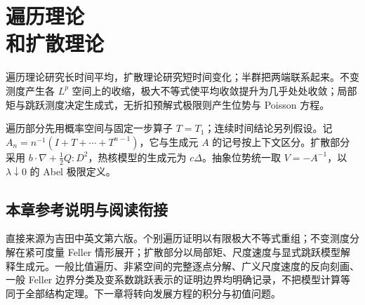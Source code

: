 \chapter[遍历理论和扩散理论]{遍历理论\\和扩散理论}\label{ch:yosida-13}

遍历理论研究长时间平均，扩散理论研究短时间变化；半群把两端联系起来。不变测度产生各 $L^p$ 空间上的收缩，极大不等式使平均收敛提升为几乎处处收敛；局部矩与跳跃测度决定生成式，无折扣预解式极限则产生位势与 Poisson 方程。

遍历部分先用概率空间与固定一步算子 $T=T_1$；连续时间结论另列假设。记 $A_n=n^{-1}(I+T+\cdots+T^{n-1})$，它与生成元 $A$ 的记号按上下文区分。扩散部分采用 $b\cdot\nabla+\tfrac12Q:D^2$，热核模型的生成元为 $c\Delta$。抽象位势统一取 $V=-A^{-1}$，以 $\lambda\downarrow0$ 的 Abel 极限定义。











\section*{本章参考说明与阅读衔接}
直接来源为吉田中英文第六版。个别遍历证明以有限极大不等式重组；不变测度分解在紧可度量 Feller 情形展开；扩散部分以局部矩、尺度速度与显式跳跃模型解释生成元。一般比值遍历、非紧空间的完整逐点分解、广义尺度速度的反向刻画、一般 Feller 边界分类及变系数跳跃表示的证明边界均明确记录，不把模型计算等同于全部结构定理。下一章将转向发展方程的积分与初值问题。
